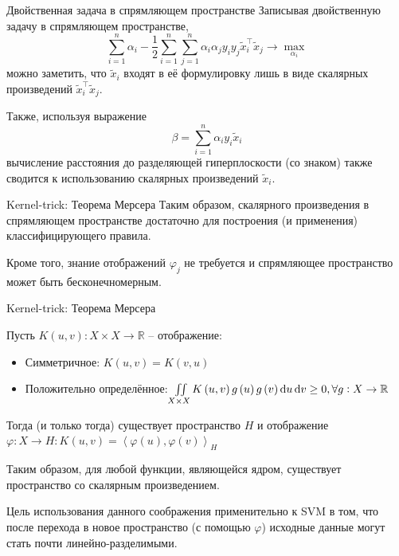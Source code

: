 \begin{frame}{Двойственная задача в спрямляющем пространстве}
	Записывая двойственную задачу в спрямляющем пространстве,
	$$
		\sum\limits_{i=1}^{n}\alpha_i - \frac{1}{2}\sum\limits_{i=1}^n\sum\limits_{j=1}^n\alpha_i\alpha_jy_iy_j\tilde{x}_i^\intercal \tilde{x}_j \rightarrow \max\limits_{\alpha_i} 
	$$
	можно заметить, что $\tilde{x}_i$ входят в её формулировку лишь в виде скалярных произведений $\tilde{x}_i^\intercal \tilde{x}_j$.

	Также, используя выражение
	$$\beta = \sum\limits_{i=1}^{n}\alpha_i y_i \tilde{x}_i$$
	вычисление расстояния до разделяющей гиперплоскости (со знаком)
	также сводится к использованию скалярных произведений $\tilde{x}_i$.

\end{frame}

\begin{frame}{Kernel-trick: Теорема Мерсера}
	Таким образом, скалярного произведения в спрямляющем
	пространстве достаточно для построения (и применения) классифицирующего правила.

	Кроме того, знание отображений $\varphi_j$ не требуется и спрямляющее пространство может быть бесконечномерным.
\end{frame}

\begin{frame}{Kernel-trick: Теорема Мерсера}

	\begin{thr}
		Пусть $K\left(u,v\right):X\times X\rightarrow \mathbb{R}$ -- отображение:
		\begin{itemize}
			\item Симметричное: $K\left(u, v\right)=K\left(v, u\right)$
			\item Положительно определённое: $\iint\limits_{X\times X}K\left(u,v\right)g\left(u\right)g\left(v\right)\mathop{}\!\mathrm{d}{u}\mathop{}\!\mathrm{d}{v}\geq 0, \forall g:X\rightarrow \mathbb{R}$
		\end{itemize}

		Тогда (и только тогда) существует пространство $H$ и отображение $\varphi:X\rightarrow H: K\left(u, v\right)=\left\langle\varphi\left(u\right), \varphi\left(v\right)\right\rangle_H$
	\end{thr}

	Таким образом, для любой функции, являющейся ядром, существует пространство со
	скалярным произведением.
    
    Цель использования данного соображения применительно к SVM в том, что после перехода в новое пространство
    (с помощью $\varphi$)  исходные данные могут стать почти линейно-разделимыми.
\end{frame}

